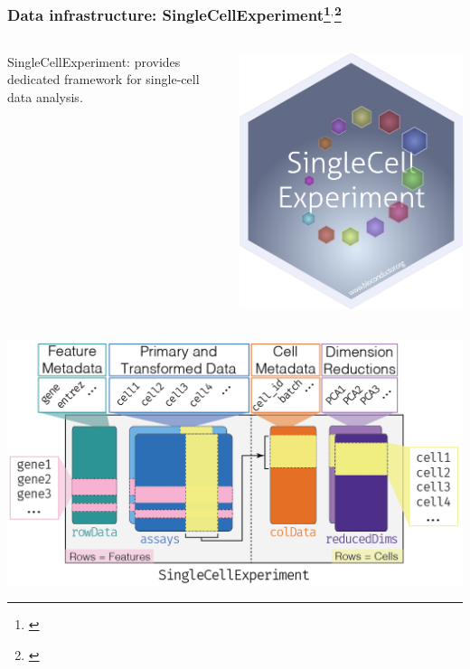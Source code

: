 \documentclass{beamer}
\newcommand{\hcode}[2][lgray]{{\ttfamily\color{vdgray}\colorbox{#1}{#2}}}
\newcommand{\frametitlesection}[1]{\frametitle{\centering #1 \footnotesize \hspace{0pt plus 1 filll} \insertsection}}
\begin{document}
\begin{frame}
    \frametitlesection{Data infrastructure: SingleCellExperiment\footnote{\citet{sce}}$^,$\footnote{\citet{Amezquita2019-bf}}}
    \begin{columns}
        \begin{column}{0.8\textwidth}
            \hcode{SingleCellExperiment}: provides dedicated framework for
            single-cell data analysis.
        \end{column}
        \begin{column}{0.2\textwidth}
            \includegraphics[width=\linewidth]{figs/sticker_SingleCellExperiment.png}
        \end{column}
    \end{columns}

    \includegraphics[width=0.9\linewidth]{figs/SingleCellExperiment.png}

\end{frame}
\end{document}
